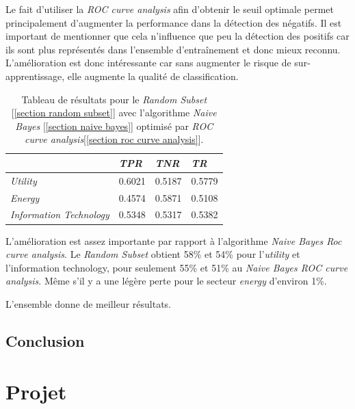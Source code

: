 \documentclass[a4paper, 11pt]{article}
\begin{document}
Le fait d'utiliser la \textit{ROC curve analysis} afin d'obtenir le seuil optimale permet principalement d'augmenter la performance dans la détection des négatifs. Il est important de mentionner que cela n'influence que peu la détection des positifs car ils sont plus représentés dans l'ensemble d'entraînement et donc mieux reconnu. L'amélioration est donc intéressante car sans augmenter le risque de sur-apprentissage, elle augmente la qualité de classification.

\begin{table}[h!]
	\centering
\begin{tabular}{|l|l|l|l|}
	\hline
	\ & \textit{TPR} & \textit{TNR} & \textit{TR}\\
	\hline
	\textit{Utility} & 0.6021 & 0.5187 & 0.5779 \\
	\hline
	\textit{Energy} & 0.4574 & 0.5871 & 0.5108\\
	\hline
	\textit{Information Technology} & 0.5348 & 0.5317 & 0.5382\\
	\hline
\end{tabular}
\caption{Tableau de résultats pour le \textit{Random Subset} [\ref{section random subset}] avec l'algorithme \textit{Naive Bayes} [\ref{section naive bayes}] optimisé par \textit{ROC curve analysis}[\ref{section roc curve analysis}].}
\end{table}

L'amélioration est assez importante par rapport à l'algorithme \textit{Naive Bayes Roc curve analysis}. Le \textit{Random Subset} obtient 58\% et 54\% pour l'\textit{utility} et l'{information technology}, pour seulement 55\% et 51\% au \textit{Naive Bayes ROC curve analysis}. Même s'il y a une légère perte pour le secteur \textit{energy} d'environ 1\%.

L'ensemble donne de meilleur résultats.


\subsection{Conclusion}
\newpage
\section{Projet}
\newpage
\end{document}
